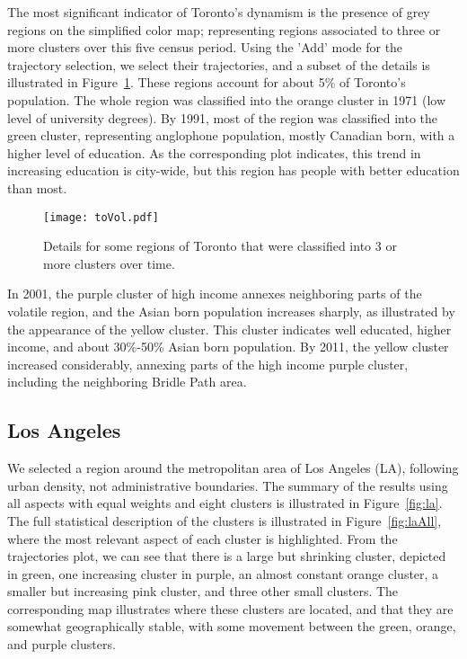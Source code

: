 The most significant indicator of Toronto's dynamism is the presence of grey
regions on the simplified color map; representing regions associated to three or
more clusters over this five census period. Using the 'Add' mode for the
trajectory selection, we select their trajectories, and a subset of the details
is illustrated in Figure~\ref{fig:toVol}. These regions account for about 5\% of
Toronto's population. The whole region was classified into the orange cluster in
1971 (low level of university degrees). By 1991, most of the region was
classified into the green cluster, representing anglophone population, mostly
Canadian born, with a higher level of education. As the corresponding plot
indicates, this trend in increasing education is city-wide, but this region has
people with better education than most.

\begin{figure}
    \centering 
    \texttt{[image: toVol.pdf]}
    \caption{Details for some regions of Toronto that were classified into 3 or
         more clusters over time.\label{fig:toVol}}
\end{figure}

In 2001, the purple cluster of high income annexes neighboring parts of the
volatile region, and the Asian born population increases sharply, as illustrated
by the appearance of the yellow cluster.  This cluster indicates well educated,
higher income, and about 30\%-50\% Asian born population. By 2011, the yellow
cluster increased considerably, annexing parts of the high income purple
cluster, including the neighboring Bridle Path area.


\subsection{Los Angeles}%
We selected a region around the metropolitan area of Los Angeles (LA), following
urban density, not administrative boundaries. The summary of the results using
all aspects with equal weights and eight clusters is illustrated in
Figure~\ref{fig:la}. The full statistical description of the clusters is
illustrated in Figure~\ref{fig:laAll}, where the most relevant aspect of each
cluster is highlighted. From the trajectories plot, we can see that there is a
large but shrinking cluster, depicted in green, one increasing cluster in
purple, an almost constant orange cluster, a smaller but increasing pink
cluster, and three other small clusters. The corresponding map illustrates where
these clusters are located, and that they are somewhat geographically stable,
with some movement between the green, orange, and purple clusters.

